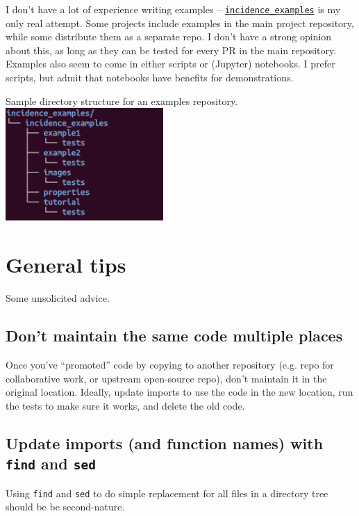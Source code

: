 \documentclass{article}
\begin{document}
I don't have a lot of experience writing examples --
\href{https://github.com/Robbybp/incidence_examples}{\texttt{incidence\_examples}}
is my only real attempt. Some projects include examples in the main project
repository, while some distribute them as a separate repo.
I don't have a strong opinion about this, as long as they can be tested
for every PR in the main repository.
Examples also seem to come in either scripts or (Jupyter) notebooks.
I prefer scripts, but admit that notebooks have benefits for demonstrations.

\begin{center}
  Sample directory structure for an examples repository.\\
  \includegraphics[width=6cm]{incidence_examples_tree_small}
\end{center}

\section{General tips}
Some unsolicited advice.

\subsection{Don't maintain the same code multiple places}
Once you've ``promoted'' code by copying to another repository
(e.g. repo for collaborative work, or upstream open-source repo),
don't maintain it in the original location.
Ideally, update imports to use the code in the new location,
run the tests to make sure it works, and delete the old code.

\subsection{Update imports (and function names) with
\texttt{find} and \texttt{sed}}
Using \texttt{find} and \texttt{sed} to do simple replacement
for all files in a directory tree should be be second-nature.
\end{document}
